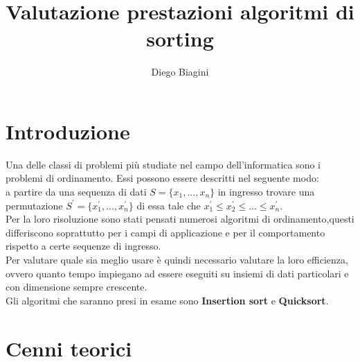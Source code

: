 \documentclass[]{article}
\author{Diego Biagini}
\title{Valutazione prestazioni algoritmi di sorting}
\begin{document}
\maketitle
\newpage
\section{Introduzione}
Una delle classi di problemi più studiate nel campo dell'informatica sono i problemi di ordinamento.
Essi possono essere descritti nel seguente modo:\\ a partire da una sequenza di dati 
$S = \{x_1, ... , x_n\}$ in ingresso trovare una permutazione $S^{\prime} = \{x_1^{\prime}, ... , x_n^{\prime}\}$ di essa tale che $x_1^{\prime} \leq x_2^{\prime} \leq ... \leq x_n^\prime$.\\
Per la loro risoluzione sono stati pensati numerosi algoritmi di ordinamento,questi differiscono soprattutto per i campi di applicazione e per il comportamento rispetto a certe sequenze di ingresso.\\
Per valutare quale sia meglio usare è quindi necessario valutare la loro efficienza, ovvero quanto tempo impiegano ad essere eseguiti su insiemi di dati particolari e con dimensione sempre crescente.\\
Gli algoritmi che saranno presi in esame sono \textbf{Insertion sort} e \textbf{Quicksort}.


\section{Cenni teorici}
\end{document}
